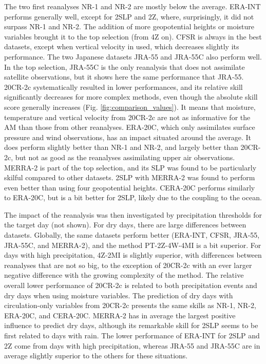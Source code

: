 \documentclass{ametsoc}
\begin{document}
The two first reanalyses NR-1 and NR-2 are mostly below the average. ERA-INT performs generally well, except for 2SLP and 2Z, where, surprisingly, it did not surpass NR-1 and NR-2. The addition of more geopotential heights or moisture variables brought it to the top selection (from 4Z on). CFSR is always in the best datasets, except when vertical velocity in used, which decreases slightly its performance. The two Japanese datasets JRA-55 and JRA-55C also perform well. In the top selection, JRA-55C is the only reanalysis that does not assimilate satellite observations, but it shows here the same performance that JRA-55. 20CR-2c systematically resulted in lower performances, and its relative skill significantly decreases for more complex methods, even though the absolute skill score generally increases (Fig. \ref{fig:comparison_values}). It means that moisture, temperature and vertical velocity from 20CR-2c are not as informative for the AM than those from other reanalyses. ERA-20C, which only assimilates surface pressure and wind observations, has an impact situated around the average. It does perform slightly better than NR-1 and NR-2, and largely better than 20CR-2c, but not as good as the reanalyses assimilating upper air observations. MERRA-2 is part of the top selection, and its SLP was found to be particularly skilful compared to other datasets. 2SLP with MERRA-2 was found to perform even better than using four geopotential heights. CERA-20C performs similarly to ERA-20C, but is a bit better for 2SLP, likely due to the coupling to the ocean.

The impact of the reanalysis was then investigated by precipitation thresholds for the target day (not shown). For dry days, there are large differences between datasets. Globally, the same datasets perform better (ERA-INT, CFSR, JRA-55, JRA-55C, and MERRA-2), and the method PT-2Z-4W-4MI is a bit superior. For days with high precipitation, 4Z-2MI is slightly superior, with differences between reanalyses that are not so big, to the exception of 20CR-2c with an ever larger negative difference with the growing complexity of the method. The relative overall lower performance of 20CR-2c is related to both precipitation events and dry days when using moisture variables. The prediction of dry days with circulation-only variables from 20CR-2c presents the same skills as NR-1, NR-2, ERA-20C, and CERA-20C. MERRA-2 has in average the largest positive influence to predict dry days, although its remarkable skill for 2SLP seems to be first related to days with rain. The lower performance of ERA-INT for 2SLP and 2Z come from days with high precipitation, whereas JRA-55 and JRA-55C are in average slightly superior to the others for these situations.
\end{document}
